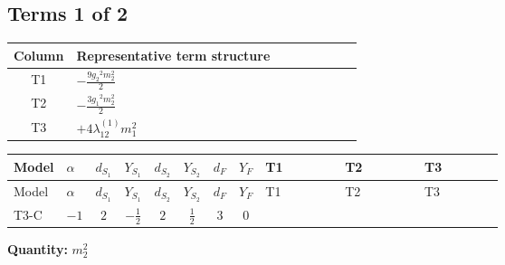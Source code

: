 \documentclass[8pt]{article}
\begin{document}
\begin{landscape}
\subsection*{Terms 1 of 2}
\begin{center}
\begin{tabular}{@{}c >{\raggedright\arraybackslash}p{0.82\linewidth}@{}}
\toprule
Column & Representative term structure \\
\midrule
T1 & \(\displaystyle -\frac{9 {g_2}^2 {m_2^2}}{2}\) \\
\midrule
T2 & \(\displaystyle -\frac{3 {g_1}^2 {m_2^2}}{2}\) \\
\midrule
T3 & \(\displaystyle +4 {\lambda_{12}^{(1)}} {m_1^2}\) \\
\midrule
\bottomrule
\end{tabular}
\end{center}
\smallskip
\tiny
\begin{longtable}{@{}llcccccc >{\raggedright\arraybackslash}p{0.21\linewidth} >{\raggedright\arraybackslash}p{0.21\linewidth} >{\raggedright\arraybackslash}p{0.21\linewidth}@{}}
\toprule
Model & $\alpha$ & $d_{S_1}$ & $Y_{S_1}$ & $d_{S_2}$ & $Y_{S_2}$ & $d_F$ & $Y_F$ & T1 & T2 & T3 \\
\midrule
\endfirsthead
\toprule
Model & $\alpha$ & $d_{S_1}$ & $Y_{S_1}$ & $d_{S_2}$ & $Y_{S_2}$ & $d_F$ & $Y_F$ & T1 & T2 & T3 \\
\midrule
\endhead
T3-C & $-1$ & $2$ & $-\frac{1}{2}$ & $2$ & $\frac{1}{2}$ & $3$ & $0$ & \scriptsize\adjustbox{max width=\linewidth}{$\begin{gathered} -\frac{9 {g_2}^2 {m_2^2}}{2}\end{gathered}$} & \scriptsize\adjustbox{max width=\linewidth}{$\begin{gathered} -\frac{3 {g_1}^2 {m_2^2}}{2}\end{gathered}$} & \scriptsize\adjustbox{max width=\linewidth}{$\begin{gathered} +4 {\lambda_{12}^{(1)}} {m_1^2}\end{gathered}$} \\
\midrule
\bottomrule
\end{longtable}
\clearpage
\noindent\textbf{Quantity: }$m_2^2$\par\smallskip

\end{landscape}
\end{document}
